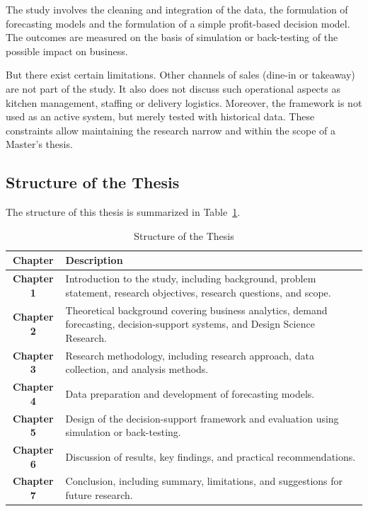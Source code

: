 The study involves the cleaning and integration of the data, the formulation of forecasting models and the formulation of a simple profit-based decision model. The outcomes are measured on the basis of simulation or back-testing of the possible impact on business.

But there exist certain limitations. Other channels of sales (dine-in or takeaway) are not part of the study. It also does not discuss such operational aspects as kitchen management, staffing or delivery logistics. Moreover, the framework is not used as an active system, but merely tested with historical data. These constraints allow maintaining the research narrow and within the scope of a Master’s thesis.

\subsection{Structure of the Thesis}
The structure of this thesis is summarized in Table~\ref{tab:thesis_structure}.

\begin{table}[ht]
\centering
\renewcommand{\arraystretch}{1.5}
\begin{tabular}{|c|p{10cm}|}
\hline
\textbf{Chapter} & \textbf{Description} \\ \hline

\textbf{Chapter 1} &
Introduction to the study, including background, problem statement,
research objectives, research questions, and scope. \\ \hline

\textbf{Chapter 2} &
Theoretical background covering business analytics, demand forecasting,
decision-support systems, and Design Science Research. \\ \hline

\textbf{Chapter 3} &
Research methodology, including research approach, data collection,
and analysis methods. \\ \hline

\textbf{Chapter 4} &
Data preparation and development of forecasting models. \\ \hline

\textbf{Chapter 5} &
Design of the decision-support framework and evaluation using simulation
or back-testing. \\ \hline

\textbf{Chapter 6} &
Discussion of results, key findings, and practical recommendations. \\ \hline

\textbf{Chapter 7} &
Conclusion, including summary, limitations, and suggestions for future research. \\ \hline

\end{tabular}
\caption{Structure of the Thesis}
\label{tab:thesis_structure}
\end{table}